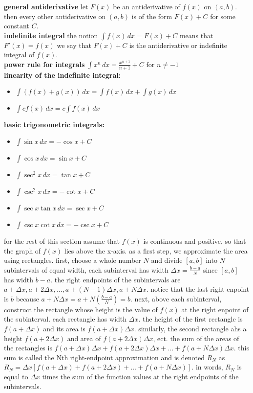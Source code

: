 \documentclass{article}
\begin{document}
\textbf{general antiderivative} let $F(x)$ be an antiderivative of $f(x)$ on $(a, b)$. then every other antiderivative on $(a, b)$ is of the form $F(x) + C$ for some constant $C$.\\

\textbf{indefinite integral} the notion $\int f(x)\,dx = F(x) + C$ means that $F'(x) = f(x)$ we say that $F(x) + C$ is the antiderivative or indefinite integral of $f(x)$.\\

\textbf{power rule for integrals} $\int x^n\,dx = \frac{x^{n + 1}}{n + 1} + C$ for $n \neq -1$\\ 

\textbf{linearity of the indefinite integral:}
	\begin{itemize}
		\item $\int (f(x) + g(x))\,dx = \int f(x)\,dx + \int g(x)\,dx$
		\item $\int cf(x)\,dx = c\int f(x)\,dx$
	\end{itemize}

\textbf{basic trigonometric integrals:}
	\begin{itemize}		
		\item $\int \sin x \,dx = -\cos x + C$
		\item $\int \cos x \,dx = \sin x + C$
		\item $\int \sec^2 x \,dx = \tan x + C$
		\item $\int \csc^2 x \,dx = -\cot x + C$
		\item $\int \sec x \tan x \,dx = \sec x + C$
		\item $\int \csc x \cot x \,dx = -\csc x + C$
	\end{itemize}

for the rest of this section assume that $f(x)$ is continuous and positive, so that the graph of $f(x)$ lies above the x-axis. as a first step, we approximate the area using rectangles. first, choose a whole number $N$ and divide $[a, b]$ into $N$ subintervals of equal width, each subinterval has width $\Delta x = \frac{b - a}{N}$ since $[a, b]$ has width $b - a$. the right endpoints of the subintervals are $a + \Delta x, a + 2\Delta x, \ldots, a + (N - 1)\Delta x, a + N\Delta x$. notice that the last right enpoint is $b$ because $a + N\Delta x = a + N(\frac{b - a}{N}) = b$. next, above each subinterval, construct the rectangle whose height is the value of $f(x)$ at the right enpoint of the subinterval. each rectangle has width $\Delta x$. the height of the first rectangle is $f(a + \Delta x)$ and its area is $f(a + \Delta x)\Delta x$. similarly, the second rectangle ahs a height $f(a + 2\Delta x)$ and area of $f(a + 2\Delta x)\Delta x$, ect. the sum of the areas of the rectangles is $f(a + \Delta x)\Delta x + f(a + 2\Delta x)\Delta x + \ldots + f(a + N\Delta x)\Delta x$. this sum is called the Nth right-endpoint approximation and is denoted $R_N$ as $R_N = \Delta x[f(a + \Delta x) + f(a + 2\Delta x) + \ldots + f(a + N\Delta x)]$. in words, $R_N$ is equal to $\Delta x$ times the sum of the function values at the right endpoints of the subintervals.\\
\end{document}
